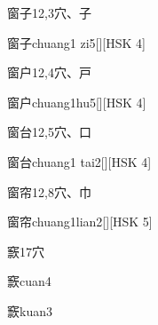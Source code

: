 \begin{entry}{窗子}{12,3}{⽳、⼦}
  \begin{phonetics}{窗子}{chuang1 zi5}[][HSK 4]
  \end{phonetics}
\end{entry}

\begin{entry}{窗户}{12,4}{⽳、⼾}
  \begin{phonetics}{窗户}{chuang1hu5}[][HSK 4]
  \end{phonetics}
\end{entry}

\begin{entry}{窗台}{12,5}{⽳、⼝}
  \begin{phonetics}{窗台}{chuang1 tai2}[][HSK 4]
  \end{phonetics}
\end{entry}

\begin{entry}{窗帘}{12,8}{⽳、⼱}
  \begin{phonetics}{窗帘}{chuang1lian2}[][HSK 5]
  \end{phonetics}
\end{entry}

\begin{entry}{窾}{17}{⽳}
  \begin{phonetics}{窾}{cuan4}
  \end{phonetics}
  \begin{phonetics}{窾}{kuan3}
  \end{phonetics}
\end{entry}


